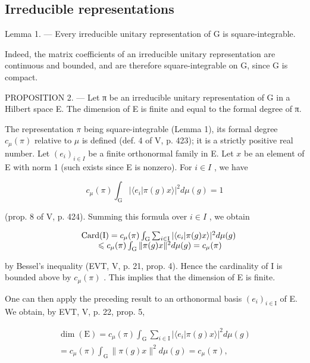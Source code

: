 \subsection{Irreducible representations}

Lemma 1. --- Every irreducible unitary representation of G is square-integrable.

Indeed, the matrix coefficients of an irreducible unitary representation are continuous and bounded, and are therefore square-integrable on G, since G is compact.

PROPOSITION 2. --- Let π be an irreducible unitary representation of G in a Hilbert space E. The dimension of E is finite and equal to the formal degree of π.

The representation \(\pi\) being square-integrable (Lemma 1), its formal degree \(c_{\mu}(\pi)\) relative to \(\mu\) is defined (def. 4 of V, p. 423); it is a strictly positive real number. Let \((e_i)_{i \in I}\) be a finite orthonormal family in E. Let \(x\) be an element of E with norm 1 (such exists since E is nonzero). For \(i \in I\) , we have

\[
c _ {\mu} (\pi) \int_ {\mathrm{G}} | \langle e _ {i} | \pi (g) x \rangle | ^ {2} d \mu (g) = 1
\]

(prop. 8 of V, p. 424). Summing this formula over \(i \in I\) , we obtain

\[
\begin{array}{r l} & {\mathrm{Card(I)} = c _ {\mu} (\pi) \int_ {\mathrm{G}} \sum_ {i \in \mathrm{I}} | \langle e _ {i} | \pi (g) x \rangle | ^ {2} d \mu (g)} \\ & {\qquad \leqslant c _ {\mu} (\pi) \int_ {\mathrm{G}} \| \pi (g) x \| ^ {2} d \mu (g) = c _ {\mu} (\pi)} \end{array}
\]

by Bessel's inequality (EVT, V, p. 21, prop. 4). Hence the cardinality of I is bounded above by \(c_{\mu}(\pi)\) . This implies that the dimension of E is finite.

One can then apply the preceding result to an orthonormal basis \((e_{i})_{i\in\mathrm{I}}\) of E. We obtain, by EVT, V, p. 22, prop. 5,

\[
\begin{array}{r} \dim (\mathrm{E}) = c _ {\mu} (\pi) \int_ {\mathrm{G}} \sum_ {i \in \mathrm{I}} | \langle e _ {i} | \pi (g) x \rangle | ^ {2} d \mu (g) \\ = c _ {\mu} (\pi) \int_ {\mathrm{G}} \| \pi (g) x \| ^ {2} d \mu (g) = c _ {\mu} (\pi), \end{array}
\]

